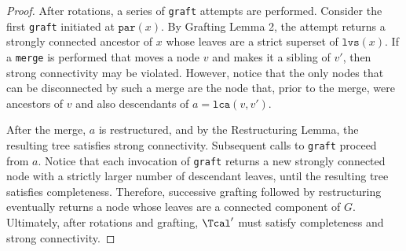 \documentclass{article} \usepackage[utf8]{inputenc} \usepackage[T1]{fontenc}    \usepackage{hyperref}       \usepackage{url}            \usepackage{booktabs}       \usepackage{amsfonts}       \usepackage{nicefrac}       \usepackage{microtype}      \usepackage{geometry}
\newcommand{\graft}{\texttt{graft}\xspace}
\newcommand{\lvs}[1]{\ensuremath{\texttt{lvs}(#1)}}
\newcommand{\lca}[2]{\ensuremath{\texttt{lca}(#1, #2)}}
\newcommand{\parent}[1]{\ensuremath{\texttt{par}}(#1)\xspace}
\begin{document}
\begin{appendix}
\begin{proof}
After rotations, a series of \graft attempts are performed. Consider
the first \graft initiated at $\parent{x}$.
By Grafting Lemma 2, the
attempt returns a strongly connected ancestor of $x$ whose leaves are
a strict superset of $\lvs{x}$.  If a \texttt{merge} is performed that
moves a node $v$ and makes it a sibling of $v'$, then strong
connectivity may be violated. However, notice that the only nodes that
can be disconnected by such a merge are the node that, prior to the
merge, were ancestors of $v$ and also descendants of $a = \lca{v}{v'}$.

After the merge, $a$ is restructured, and by the Restructuring Lemma,
the resulting tree satisfies strong connectivity. Subsequent calls to
\graft proceed from $a$. Notice that each invocation of \graft returns
a new strongly connected node with a strictly larger number of
descendant leaves, until the resulting tree satisfies completeness.
Therefore, successive grafting followed by restructuring eventually
returns a node whose leaves are a connected component of
$G$. Ultimately, after rotations and grafting, $\Tcal'$ must satisfy
completeness and strong connectivity.
\end{proof}
\end{appendix} 
\end{document}
